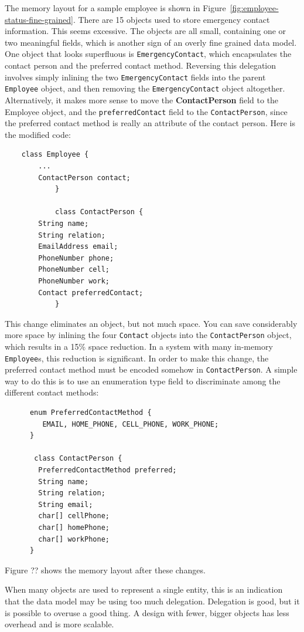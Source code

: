 The memory layout for a sample employee is shown in Figure~\ref{fig:employee-status-fine-grained}. There are 15 objects used to store emergency contact information. This seems excessive. The objects are all small, containing one or two meaningful fields, which is another sign of an overly fine grained data model. One object that looks superfluous is \texttt{EmergencyContact}, which encapsulates the contact person and the preferred contact method.  
Reversing this delegation involves simply inlining the two \texttt{EmergencyContact} fields into the parent \texttt{Employee} object, and then removing the \texttt{EmergencyContact} object altogether. Alternatively, it makes more sense to move the \textbf{ContactPerson} field to the Employee object, and the \texttt{preferredContact} field to the \texttt{ContactPerson}, since the preferred contact method is really an attribute of the contact person. Here is the modified code:
\ttfamily
\begin{verbatim}
	class Employee {
        ...
        ContactPerson contact;
			}
			
			class ContactPerson {
        String name;
        String relation;
        EmailAddress email;
        PhoneNumber phone;
        PhoneNumber cell;
        PhoneNumber work;
        Contact preferredContact;
			}
\end{verbatim}
\normalfont
This change eliminates an object, but not much space. You can save considerably more space by inlining the four \texttt{Contact} objects into the \texttt{ContactPerson} object, which results in a 15\%  space reduction. In a system with many in-memory \texttt{Employee}s, this reduction is significant. In order to make this change, the preferred contact method must be encoded somehow in \texttt{ContactPerson}.  A simple way to do this is to use an enumeration type field to discriminate among the different contact methods:
\ttfamily
\begin{verbatim} 
      enum PreferredContactMethod {
         EMAIL, HOME_PHONE, CELL_PHONE, WORK_PHONE;
      }
      
       class ContactPerson {
        PreferredContactMethod preferred;
        String name;
        String relation;
        String email;
        char[] cellPhone;
        char[] homePhone;
        char[] workPhone;
      }		
\end{verbatim}
\normalfont
Figure ?? shows the memory layout after these changes.

When many objects are used to represent a single entity, this is an indication that the data model may be using too much delegation. Delegation is good, but it is possible to overuse a good thing. A design with fewer, bigger objects has less overhead and is more scalable. 

